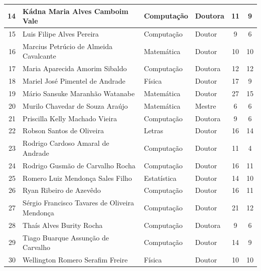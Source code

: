 \documentclass[
	12pt,				%
	openright,			%
  oneside,     %
	a4paper,			%
	chapter=TITLE,		%
	english,			%
	french,				%
	spanish,			%
	brazil				%
	]{abntex2}
\begin{document}
\begin{center}
\begin{scriptsize}
\begin{longtable}{rp{6cm}p{1.8cm}p{1.4cm}p{1.9cm}p{1.8cm}}
    14 & Kádna Maria Alves Camboim Vale & Computação & Doutora & \multicolumn{1}{c}{11} & \multicolumn{1}{c}{9}\\ \midrule
    15 & Luis Filipe Alves Pereira & Computação & Doutor & \multicolumn{1}{c}{9} & \multicolumn{1}{c}{6}\\ \midrule
    16 & Marcius Petrúcio de Almeida Cavalcante & Matemática & Doutor & \multicolumn{1}{c}{10} & \multicolumn{1}{c}{10}\\ \midrule
    17 & Maria Aparecida Amorim Sibaldo & Computação & Doutora & \multicolumn{1}{c}{12} & \multicolumn{1}{c}{12}\\ \midrule
    18 & Mariel José Pimentel de Andrade & Física & Doutor & \multicolumn{1}{c}{17} & \multicolumn{1}{c}{9}\\ \midrule
    19 & Mário Sansuke Maranhão Watanabe & Matemática & Doutor & \multicolumn{1}{c}{27} & \multicolumn{1}{c}{15}\\ \midrule
    20 & Murilo Chavedar de Souza Araújo & Matemática & Mestre & \multicolumn{1}{c}{6} & \multicolumn{1}{c}{6}\\ \midrule
    21 & Priscilla Kelly Machado Vieira & Computação & Doutora & \multicolumn{1}{c}{9} & \multicolumn{1}{c}{6}\\ \midrule
    22 & Robson Santos de Oliveira & Letras & Doutor & \multicolumn{1}{c}{16} & \multicolumn{1}{c}{14}\\ \midrule
    23 & Rodrigo Cardoso Amaral de Andrade & Computação & Doutor & \multicolumn{1}{c}{11} & \multicolumn{1}{c}{4}\\ \midrule
    24 & Rodrigo Gusmão de Carvalho Rocha & Computação & Doutor & \multicolumn{1}{c}{16} & \multicolumn{1}{c}{11}\\ \midrule
    25 & Romero Luiz Mendonça Sales Filho & Estatística & Doutor & \multicolumn{1}{c}{14} & \multicolumn{1}{c}{10}\\ \midrule
    26 & Ryan Ribeiro de Azevêdo & Computação & Doutor & \multicolumn{1}{c}{16} & \multicolumn{1}{c}{11}\\ \midrule
    27 & Sérgio Francisco Tavares de Oliveira Mendonça & Computação & Doutor & \multicolumn{1}{c}{21} & \multicolumn{1}{c}{12}\\ \midrule
    28 & Thaís Alves Burity Rocha & Computação & Doutora & \multicolumn{1}{c}{9} & \multicolumn{1}{c}{6}\\ \midrule
    29 & Tiago Buarque Assunção de Carvalho & Computação & Doutor & \multicolumn{1}{c}{14} & \multicolumn{1}{c}{9}\\ \midrule
    30 & Wellington Romero Serafim Freire & Física & Doutor & \multicolumn{1}{c}{10} & \multicolumn{1}{c}{10}\\ 
\bottomrule
\end{longtable}
\end{scriptsize}      
\end{center}
\end{document}
